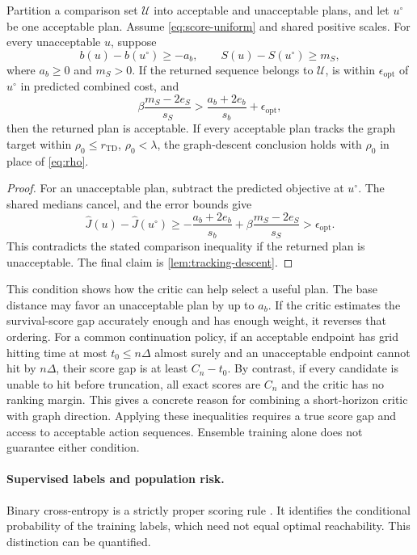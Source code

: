 \documentclass{article} %
\newcommand{\Htd}{r_{\mathrm{TD}}}
\theoremstyle{definition}
\theoremstyle{remark}
\begin{document}
\begin{proposition}
\label{prop:critic-screen}
Partition a comparison set $\mathcal U$ into acceptable and unacceptable plans,
and let $u^\circ$ be one acceptable plan.
Assume \cref{eq:score-uniform} and shared positive scales.
For every unacceptable $u$, suppose
\[
 b(u)-b(u^\circ)\ge-a_b,\qquad
 S(u)-S(u^\circ)\ge m_S,
\]
where $a_b\ge0$ and $m_S>0$.
If the returned sequence belongs to $\mathcal U$, is within
$\epsilon_{\mathrm{opt}}$ of $u^\circ$ in predicted combined cost, and
\begin{equation}
 \beta\frac{m_S-2e_S}{s_S}
   > \frac{a_b+2e_b}{s_b}+\epsilon_{\mathrm{opt}},
 \label{eq:critic-margin}
\end{equation}
then the returned plan is acceptable.
If every acceptable plan tracks the graph target within
$\rho_0\le\Htd$, $\rho_0<\lambda$, the graph-descent conclusion holds with
$\rho_0$ in place of \cref{eq:rho}.
\end{proposition}
\begin{proof}
For an unacceptable plan, subtract the predicted objective at $u^\circ$.
The shared medians cancel, and the error bounds give
\[
 \widehat J(u)-\widehat J(u^\circ)
 \ge-\frac{a_b+2e_b}{s_b}
       +\beta\frac{m_S-2e_S}{s_S}
 >\epsilon_{\mathrm{opt}} .
\]
This contradicts the stated comparison inequality if the returned plan is
unacceptable. The final claim is \cref{lem:tracking-descent}.
\end{proof}

This condition shows how the critic can help select a useful plan.
The base distance may favor an unacceptable plan by up to $a_b$. If the critic estimates
the survival-score gap accurately enough and has enough weight, it reverses that ordering.
For a common continuation policy, if an acceptable endpoint has grid
hitting time at most $t_0\le n\Delta$ almost surely and an unacceptable endpoint cannot
hit by $n\Delta$, their score gap is at least $C_n-t_0$.
By contrast, if every candidate is unable to hit before truncation, all exact scores
are $C_n$ and the critic has no ranking margin. This gives a concrete reason for
combining a short-horizon critic with graph direction.
Applying these inequalities requires a true score gap and access to acceptable action
sequences. Ensemble training alone does not guarantee either condition.

\paragraph{Supervised labels and population risk.}
Binary cross-entropy is a strictly proper scoring rule \citep{gneiting2007}.
It identifies the conditional probability of the training labels, which need
not equal optimal reachability. This distinction can be quantified.
\end{document}
